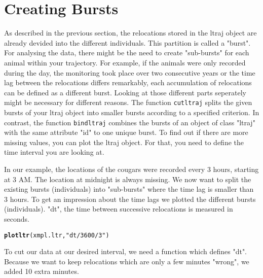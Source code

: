 \documentclass{article}\usepackage[]{graphicx}\usepackage[]{color}
\makeatletter
\newcommand{\hlstr}[1]{\textcolor[rgb]{0.192,0.494,0.8}{#1}}%
\newcommand{\hlstd}[1]{\textcolor[rgb]{0.345,0.345,0.345}{#1}}%
\newcommand{\hlkwd}[1]{\textcolor[rgb]{0.737,0.353,0.396}{\textbf{#1}}}%
\newenvironment{kframe}{%
 \def\at@end@of@kframe{}%
 \ifinner\ifhmode%
  \def\at@end@of@kframe{\end{minipage}}%
  \begin{minipage}{\columnwidth}%
 \fi\fi%
 \def\FrameCommand##1{\hskip\@totalleftmargin \hskip-\fboxsep
 \colorbox{shadecolor}{##1}\hskip-\fboxsep
     \hskip-\linewidth \hskip-\@totalleftmargin \hskip\columnwidth}%
 \MakeFramed {\advance\hsize-\width
   \@totalleftmargin\z@ \linewidth\hsize
   \@setminipage}}%
 {\par\unskip\endMakeFramed%
 \at@end@of@kframe}
\newenvironment{knitrout}{}{} %
\makeatother
\begin{document}






\section{Creating Bursts}%

As described in the previous section, the relocations stored in the ltraj object are already devided into the different individuals. This partition is called a "burst". For analysing the data, there might be the need to create "sub-bursts" for each animal within your trajectory. For example, if the animals were only recorded during the day, the monitoring took place over two consecutive years or the time lag between the relocations differs remarkably, each accumulation of relocations can be defined as a different burst. Looking at those different parts seperately might be necessary for different reasons. The function \texttt{cutltraj} splits the given bursts of your ltraj object into smaller bursts according to a specified criterion. In contrast, the function \texttt{bindltraj} combines the bursts of an object of class "ltraj" with the same attribute "id" to one unique burst. To find out if there are more missing values, you can plot the ltraj object. For that, you need to define the time interval you are looking at. \cite{0.3.162014}


In our example, the locations of the cougars were recorded every 3 hours, starting at 3 AM. The location at midnight is always missing. We now want to split the existing bursts (individuals) into "sub-bursts" where the time lag is smaller than 3 hours. To get an impression about the time lags we plotted the different bursts (individuals). "dt", the time between successive relocations is measured in seconds.

\begin{knitrout}
\color{fgcolor}\begin{kframe}
\begin{alltt}
\hlkwd{plotltr}\hlstd{(xmpl.ltr,} \hlstr{"dt/3600/3"}\hlstd{)}
\end{alltt}
\end{kframe}
\end{knitrout}

To cut our data at our desired interval, we need a function which defines "dt". Because we want to keep relocations which are only a few minutes "wrong", we added 10 extra minutes.
\end{document}
